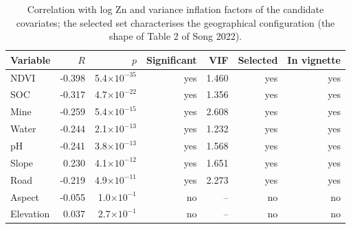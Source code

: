 \begin{table}[t]\centering
\caption{Correlation with log Zn and variance inflation factors of the candidate covariates; the selected set characterises the geographical configuration (the shape of Table 2 of Song 2022).}\label{tab:varsel}
\begin{tabular}{lrrrrrr}
\hline
Variable & $R$ & $p$ & Significant & VIF & Selected & In vignette \\
\hline
NDVI & -0.398 & 5.4$\times 10^{-35}$ & yes & 1.460 & yes & yes \\
SOC & -0.317 & 4.7$\times 10^{-22}$ & yes & 1.356 & yes & yes \\
Mine & -0.259 & 5.4$\times 10^{-15}$ & yes & 2.608 & yes & yes \\
Water & -0.244 & 2.1$\times 10^{-13}$ & yes & 1.232 & yes & yes \\
pH & -0.241 & 3.8$\times 10^{-13}$ & yes & 1.568 & yes & yes \\
Slope & 0.230 & 4.1$\times 10^{-12}$ & yes & 1.651 & yes & yes \\
Road & -0.219 & 4.9$\times 10^{-11}$ & yes & 2.273 & yes & yes \\
Aspect & -0.055 & 1.0$\times 10^{-1}$ & no & -- & no & no \\
Elevation & 0.037 & 2.7$\times 10^{-1}$ & no & -- & no & no \\
\hline
\end{tabular}\end{table}
